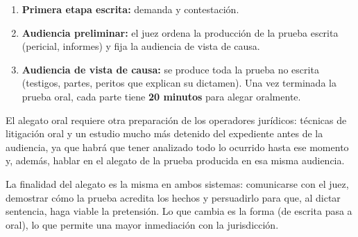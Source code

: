 \documentclass[12pt,oneside]{book}
\begin{document}
\begin{enumerate}
    \item \textbf{Primera etapa escrita:} demanda y contestación.
    \item \textbf{Audiencia preliminar:} el juez ordena la producción de la prueba escrita (pericial, informes) y fija la audiencia de vista de causa.
    \item \textbf{Audiencia de vista de causa:} se produce toda la prueba no escrita (testigos, partes, peritos que explican su dictamen). Una vez terminada la prueba oral, cada parte tiene \textbf{20 minutos} para alegar oralmente.
\end{enumerate}

El alegato oral requiere otra preparación de los operadores jurídicos: técnicas de litigación oral y un estudio mucho más detenido del expediente antes de la audiencia, ya que habrá que tener analizado todo lo ocurrido hasta ese momento y, además, hablar en el alegato de la prueba producida en esa misma audiencia.

La finalidad del alegato es la misma en ambos sistemas: comunicarse con el juez, demostrar cómo la prueba acredita los hechos y persuadirlo para que, al dictar sentencia, haga viable la pretensión. Lo que cambia es la forma (de escrita pasa a oral), lo que permite una mayor inmediación con la jurisdicción.
\end{document}
